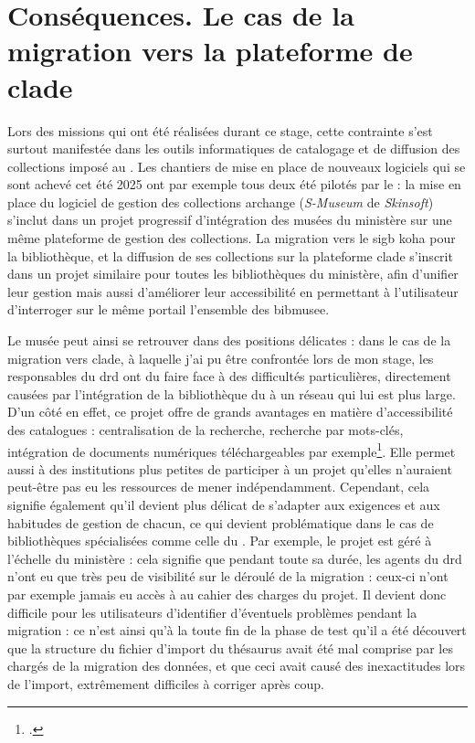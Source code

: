 \section{\label{I-B-2}Conséquences. Le cas de la migration vers la plateforme de \gls{clade}}

Lors des missions qui ont été réalisées durant ce stage, cette contrainte s'est surtout manifestée dans les outils informatiques de catalogage et de diffusion des collections imposé au \mae. Les chantiers de mise en place de nouveaux logiciels qui se sont achevé cet été 2025 ont par exemple tous deux été pilotés par le \minarm : la mise en place du logiciel de gestion des collections \gls{archange} (\textit{S-Museum} de \textit{Skinsoft}) s'inclut dans un projet progressif d'intégration des musées du ministère sur une même plateforme de gestion des collections. La migration vers le \ac{sigb} \gls{koha} pour la bibliothèque, et la diffusion de ses collections sur la plateforme \gls{clade} s'inscrit dans un projet similaire pour toutes les bibliothèques du ministère, afin d'unifier leur gestion mais aussi d'améliorer leur accessibilité en permettant à l'utilisateur d'interroger sur le même portail l'ensemble des \gls{bibmusee}.

Le musée peut ainsi se retrouver dans des positions délicates : dans le cas de la migration vers \gls{clade}, à laquelle j'ai pu être confrontée lors de mon stage, les responsables du \ac{drd} ont du faire face à des difficultés particulières, directement causées par l'intégration de la bibliothèque du \mae à un réseau qui lui est plus large. D'un côté en effet, ce projet offre de grands avantages en matière d'accessibilité des catalogues : centralisation de la recherche, recherche par mots-clés, intégration de documents numériques téléchargeables par exemple\footcite{ministeredesarmeesKitCommunicationCLADE}. Elle permet aussi à des institutions plus petites de participer à un projet qu'elles n'auraient peut-être pas eu les ressources de mener indépendamment. Cependant, cela signifie également qu'il devient plus délicat de s'adapter aux exigences et aux habitudes de gestion de chacun, ce qui devient problématique dans le cas de bibliothèques spécialisées comme celle du \mae. Par exemple, le projet est géré à l'échelle du ministère : cela signifie que pendant toute sa durée, les agents du \ac{drd} n'ont eu que très peu de visibilité sur le déroulé de la migration : ceux-ci n'ont par exemple jamais eu accès à au cahier des charges du projet. Il devient donc difficile pour les utilisateurs d'identifier d'éventuels problèmes pendant la migration : ce n'est ainsi qu'à la toute fin de la phase de test qu'il a été découvert que la structure du fichier d'import du thésaurus avait été mal comprise par les chargés de la migration des données, et que ceci avait causé des inexactitudes lors de l'import, extrêmement difficiles à corriger après coup.

